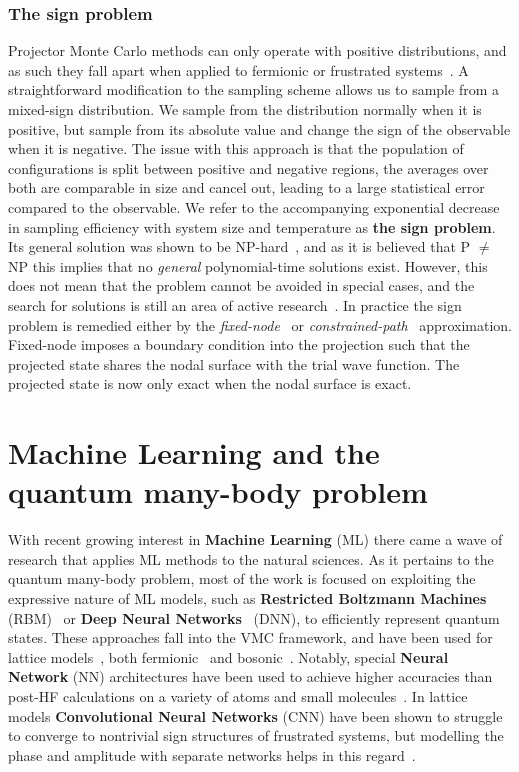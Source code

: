 \subsubsection{The sign problem}
Projector Monte Carlo methods can only operate with positive distributions, and as such they fall apart when applied to fermionic or frustrated systems~\cite{gubernatis_kawashima_werner_2016}. A straightforward modification to the sampling scheme allows us to sample from a mixed-sign distribution. We sample from the distribution normally when it is positive, but sample from its absolute value and change the sign of the observable when it is negative. The issue with this approach is that the population of configurations is split between positive and negative regions, the averages over both are comparable in size and cancel out, leading to a large statistical error compared to the observable. We refer to the accompanying exponential decrease~\cite{gubernatis_kawashima_werner_2016} in sampling efficiency with system size and temperature as \textbf{the sign problem}. Its general solution was shown to be NP-hard~\cite{troyer2005computational}, and as it is believed that P $\neq$ NP this implies that no \emph{general} polynomial-time solutions exist. However, this does not mean that the problem cannot be avoided in special cases, and the search for solutions is still an area of active research~\cite{alexandru2020complex, assaraf2007fermion, hutcheon2020stochastic}. In practice the sign problem is remedied either by the \emph{fixed-node}~\cite{anderson1975random} or \emph{constrained-path}~\cite{zhang1997constrained} approximation. Fixed-node imposes a boundary condition into the projection such that the projected state shares the nodal surface with the trial wave function. The projected state is now only exact when the nodal surface is exact.

\section{Machine Learning and the quantum many-body problem}
With recent growing interest in \textbf{Machine Learning} (ML) there came a wave of research that applies ML methods to the natural sciences. As it pertains to the quantum many-body problem, most of the work is focused on exploiting the expressive nature of ML models, such as \textbf{Restricted Boltzmann Machines} (RBM)~\cite{carleo2017solving} or \textbf{Deep Neural Networks}~\cite{cai2018approximating} (DNN), to efficiently represent quantum states. These approaches fall into the VMC framework, and have been used for lattice models~\cite{carleo2017solving}, both fermionic~\cite{nomura2017restricted} and bosonic~\cite{saito2017solving}. Notably, special \textbf{Neural Network} (NN) architectures have been used to achieve higher accuracies than post-HF calculations on a variety of atoms and small molecules~\cite{pfau2020ab, spencer2020better}. In lattice models \textbf{Convolutional Neural Networks} (CNN) have been shown to struggle to converge to nontrivial sign structures of frustrated systems, but modelling the phase and amplitude with separate networks helps in this regard~\cite{szabo2020neural}.

